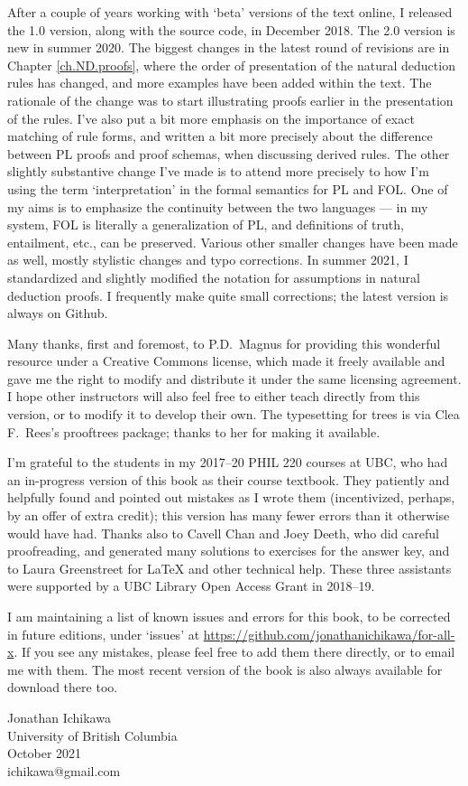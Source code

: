 After a couple of years working with `beta' versions of the text online, I released the 1.0 version, along with the source code, in December 2018. The 2.0 version is new in summer 2020. The biggest changes in the latest round of revisions are in Chapter \ref{ch.ND.proofs}, where the order of presentation of the natural deduction rules has changed, and more examples have been added within the text. The rationale of the change was to start illustrating proofs earlier in the presentation of the rules. I've also put a bit more emphasis on the importance of exact matching of rule forms, and written a bit more precisely about the difference between PL proofs and proof schemas, when discussing derived rules. The other slightly substantive change I've made is to attend more precisely to how I'm using the term `interpretation' in the formal semantics for PL and FOL. One of my aims is to emphasize the continuity between the two languages --- in my system, FOL is literally a generalization of PL, and definitions of truth, entailment, etc., can be preserved. Various other smaller changes have been made as well, mostly stylistic changes and typo corrections. In summer 2021, I standardized and slightly modified the notation for assumptions in natural deduction proofs. I frequently make quite small corrections; the latest version is always on Github.

Many thanks, first and foremost, to P.D.\ Magnus for providing this wonderful resource under a Creative Commons license, which made it freely available and gave me the right to modify and distribute it under the same licensing agreement. I hope other instructors will also feel free to either teach directly from this version, or to modify it to develop their own. The typesetting for trees is via Clea F.\ Rees's prooftrees package; thanks to her for making it available.

I'm grateful to the students in my 2017--20 PHIL 220 courses at UBC, who had an in-progress version of this book as their course textbook. They patiently and helpfully found and pointed out mistakes as I wrote them (incentivized, perhaps, by an offer of extra credit); this version has many fewer errors than it otherwise would have had. Thanks also to Cavell Chan and Joey Deeth, who did careful proofreading, and generated many solutions to exercises for the answer key, and to Laura Greenstreet for LaTeX and other technical help. These three assistants were supported by a UBC Library Open Access Grant in 2018--19.

I am maintaining a list of known issues and errors for this book, to be corrected in future editions, under `issues' at \url{https://github.com/jonathanichikawa/for-all-x}. If you see any mistakes, please feel free to add them there directly, or to email me with them. The most recent version of the book is also always available for download there too.

\begin{flushright}
Jonathan Ichikawa \\
University of British Columbia \\
October 2021 \\
ichikawa@gmail.com
\end{flushright}

\fi

